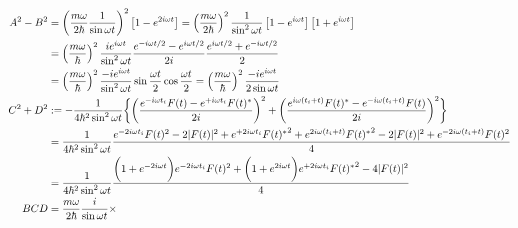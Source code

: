 \begin{subequations}
\begin{align}
    A^2 - B^2
    &=
    \left(
        \dfrac{m \omega}{2 \hbar}
        \dfrac{1}{\sin \omega t}
    \right)^2
    \left[
        1
        - e^{2 i \omega t}
    \right]
=
    \left(
        \dfrac{m \omega}{2 \hbar}
    \right)^2
    \dfrac{1}{\sin^2 \omega t}
    \left[
        1
    -
        e^{i \omega t}
    \right]
    \left[
        1
    +
        e^{i \omega t}
    \right]
\notag\\&=
    \left(
        \dfrac{m \omega}{\hbar}
    \right)^2
    \dfrac{
        i
        e^{i \omega t}
    }{\sin^2 \omega t}
    \dfrac{
            e^{- i \omega t/2}
        -
            e^{  i \omega t/2}
    }{2 i}
    \dfrac{
        e^{i \omega t/2}
    +
        e^{- i \omega t/2}
    }{2}
\notag\\&=
    \left(
        \dfrac{m \omega}{\hbar}
    \right)^2
    \dfrac{
    -
        i
        e^{i \omega t}
    }{\sin^2 \omega t}
    \sin \dfrac{\omega t}{2}
    \cos \dfrac{\omega t}{2}
=
    \left(
        \dfrac{m \omega}{\hbar}
    \right)^2
    \dfrac{
    -
        i
        e^{i \omega t}
    }{2 \sin \omega t}
\\
    C^2 + D^2
    &:=
    -
    \dfrac{1}{4 \hbar^2 \sin^2 \omega t}
    \bigg\{
        \bigg(
            \dfrac{
            e^{- i \omega t_i} F(t)
        -
            e^{+ i \omega t_i} F(t)^*
        }{ 2i }
        \bigg)^2
    +
        \bigg(
            \dfrac{
            e^{i \omega (t_i + t)} F(t)^*
        -
            e^{- i \omega (t_i + t)} F(t)
        }{ 2i }
        \bigg)^2
    \bigg\}
\notag\\&
    =
    \dfrac{1}{4 \hbar^2 \sin^2 \omega t}
    \dfrac{
            e^{- 2 i \omega t_i} F(t)^2
        -
            2 | F(t) |^2
        +
            e^{+ 2 i \omega t_i} {F(t)^*}^2
    +
            e^{2 i \omega (t_i + t)} {F(t)^*}^2
        -
            2 | F(t) |^2
        +
            e^{- 2 i \omega (t_i + t)} F(t)^2
    }{4}
\notag\\&
    =
    \dfrac{1}{4 \hbar^2 \sin^2 \omega t}
    \dfrac{
        \bigg(
            1
        +
            e^{- 2 i \omega t}
        \bigg) 
        e^{- 2 i \omega t_i}
        F(t)^2
    +
        \bigg(
            1
        +
            e^{2 i \omega t}
        \bigg) 
        e^{+ 2 i \omega t_i} {F(t)^*}^2
    -
        4 | F(t) |^2
    }{4}
\\
    BCD
    &=
    \dfrac{m \omega}{2 \hbar}
    \dfrac{ i }{\sin \omega t}
\times

\end{align}
\end{subequations}
